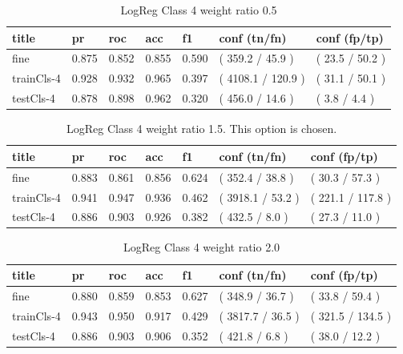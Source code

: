 \documentclass[ms]{nuthesis}
\begin{document}
\FloatBarrier
\begin{table}[H]
\centering
\begin{tabular}{|l||l||l||l||l||l||l|}\toprule
title & pr & roc & acc & f1 & conf (tn/fn) & conf (fp/tp) \\ \midrule
fine & 0.875 & 0.852 & 0.855 & 0.590 & ( 359.2 / 45.9 ) & ( 23.5 / 50.2 ) \\
trainCls-4 & 0.928 & 0.932 & 0.965 & 0.397 & ( 4108.1 / 120.9 ) & ( 31.1 / 50.1 ) \\
testCls-4 & 0.878 & 0.898 & 0.962 & 0.320 & ( 456.0 / 14.6 ) & ( 3.8 / 4.4 ) \\ \bottomrule
\end{tabular}
\caption{LogReg Class 4 weight ratio 0.5}
\label{tab:LogRegCls4-Wtp5}
\end{table}
\FloatBarrier


\FloatBarrier
\begin{table}[H]
\centering
\begin{tabular}{|l||l||l||l||l||l||l|}\toprule
title & pr & roc & acc & f1 & conf (tn/fn) & conf (fp/tp) \\ \midrule
fine & 0.883 & 0.861 & 0.856 & 0.624 & ( 352.4 / 38.8 ) & ( 30.3 / 57.3 ) \\
trainCls-4 & 0.941 & 0.947 & 0.936 & 0.462 & ( 3918.1 / 53.2 ) & ( 221.1 / 117.8 ) \\
testCls-4 & 0.886 & 0.903 & 0.926 & 0.382 & ( 432.5 / 8.0 ) & ( 27.3 / 11.0 ) \\ \bottomrule
\end{tabular}
\caption{LogReg Class 4 weight ratio 1.5. This option is chosen.}
\label{tab:LogRegCls4-Wt1p5}
\end{table}
\FloatBarrier

\FloatBarrier
\begin{table}[H]
\centering
\begin{tabular}{|l||l||l||l||l||l||l|}\toprule
title & pr & roc & acc & f1 & conf (tn/fn) & conf (fp/tp) \\ \midrule
fine & 0.880 & 0.859 & 0.853 & 0.627 & ( 348.9 / 36.7 ) & ( 33.8 / 59.4 ) \\
trainCls-4 & 0.943 & 0.950 & 0.917 & 0.429 & ( 3817.7 / 36.5 ) & ( 321.5 / 134.5 ) \\
testCls-4 & 0.886 & 0.903 & 0.906 & 0.352 & ( 421.8 / 6.8 ) & ( 38.0 / 12.2 ) \\ \bottomrule
\end{tabular}
\caption{LogReg Class 4 weight ratio 2.0}
\label{tab:LogRegCls4-Wt2}
\end{table}
\FloatBarrier
\end{document}
